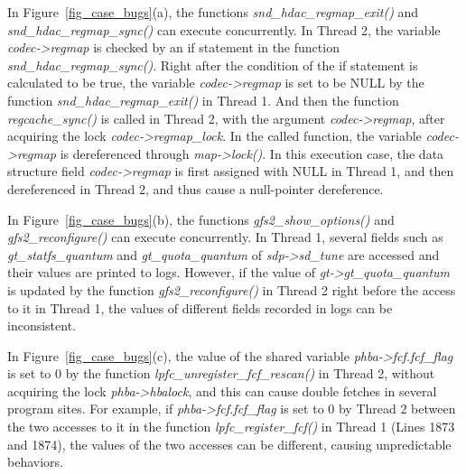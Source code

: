  In 
Figure~\ref{fig_case_bugs}(a), the functions {\em snd\_hdac\_regmap\_exit()} 
and {\em snd\_hdac\_regmap\_sync()} can execute concurrently. In Thread 2, the 
variable {\em codec->regmap} is checked by an if statement in the function {\em 
snd\_hdac\_regmap\_sync()}. Right after the condition of the if statement is 
calculated to be true, the variable {\em codec->regmap} is set to be NULL by 
the function {\em snd\_hdac\_regmap\_exit()} in Thread 1. And then the function 
{\em regcache\_sync()} is called in Thread 2, with the argument {\em 
codec->regmap}, after acquiring the lock {\em codec->regmap\_lock}. In the 
called function, the variable {\em codec->regmap} is dereferenced through 
{\em map->lock()}. In this execution case, the data structure field {\em 
codec->regmap} is first assigned with NULL in Thread 1, and then dereferenced 
in Thread 2, and thus cause a null-pointer dereference.

 In 
Figure~\ref{fig_case_bugs}(b), the functions {\em gfs2\_show\_options()} and 
{\em gfs2\_reconfigure()} can execute concurrently. In Thread 1, several fields 
such as {\em gt\_statfs\_quantum} and {\em gt\_quota\_quantum} of {\em 
sdp->sd\_tune} are accessed and their values are printed to logs. However, if 
the value of {\em gt->gt\_quota\_quantum} is updated by the function {\em 
gfs2\_reconfigure()} in Thread 2 right before the access to it in Thread 1, the 
values of different fields recorded in logs can be inconsistent.

 In Figure~\ref{fig_case_bugs}(c), 
the value of the shared variable {\em phba->fcf.fcf\_flag} is set to 0 by the 
function {\em lpfc\_unregister\_fcf\_rescan()} in Thread 2, without acquiring 
the lock {\em phba->hbalock}, and this can cause double fetches in several 
program sites. For example, if {\em phba->fcf.fcf\_flag} is set to 0 by Thread 
2 between the two accesses to it in the function {\em lpfc\_register\_fcf()} in 
Thread 1 (Lines 1873 and 1874), the values of the two accesses can be 
different, causing unpredictable behaviors.

